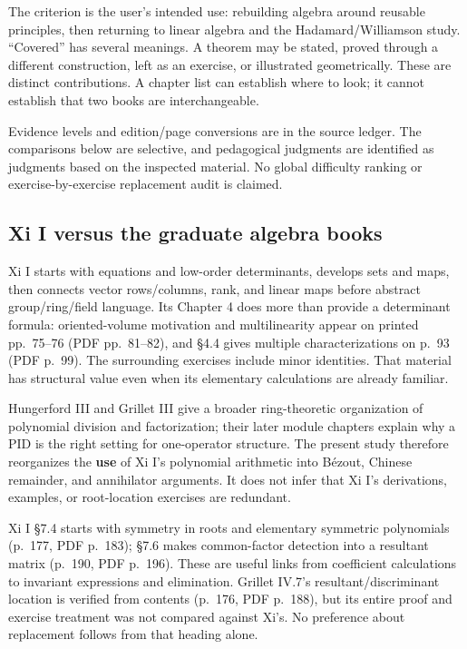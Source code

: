 \documentclass[
  11pt,
]{article}
\begin{document}
The criterion is the user's intended use: rebuilding algebra around
reusable principles, then returning to linear algebra and the
Hadamard/Williamson study. ``Covered'' has several meanings. A theorem
may be stated, proved through a different construction, left as an
exercise, or illustrated geometrically. These are distinct
contributions. A chapter list can establish where to look; it cannot
establish that two books are interchangeable.

Evidence levels and edition/page conversions are in the source ledger.
The comparisons below are selective, and pedagogical judgments are
identified as judgments based on the inspected material. No global
difficulty ranking or exercise-by-exercise replacement audit is claimed.

\subsection{Xi I versus the graduate algebra
books}\label{xi-i-versus-the-graduate-algebra-books}

Xi I starts with equations and low-order determinants, develops sets and
maps, then connects vector rows/columns, rank, and linear maps before
abstract group/ring/field language. Its Chapter 4 does more than provide
a determinant formula: oriented-volume motivation and multilinearity
appear on printed pp.~75--76 (PDF pp.~81--82), and §4.4 gives multiple
characterizations on p.~93 (PDF p.~99). The surrounding exercises
include minor identities. That material has structural value even when
its elementary calculations are already familiar.

Hungerford III and Grillet III give a broader ring-theoretic
organization of polynomial division and factorization; their later
module chapters explain why a PID is the right setting for one-operator
structure. The present study therefore reorganizes the \textbf{use} of
Xi I's polynomial arithmetic into Bézout, Chinese remainder, and
annihilator arguments. It does not infer that Xi I's derivations,
examples, or root-location exercises are redundant.

Xi I §7.4 starts with symmetry in roots and elementary symmetric
polynomials (p.~177, PDF p.~183); §7.6 makes common-factor detection
into a resultant matrix (p.~190, PDF p.~196). These are useful links
from coefficient calculations to invariant expressions and elimination.
Grillet IV.7's resultant/discriminant location is verified from contents
(p.~176, PDF p.~188), but its entire proof and exercise treatment was
not compared against Xi's. No preference about replacement follows from
that heading alone.
\end{document}
